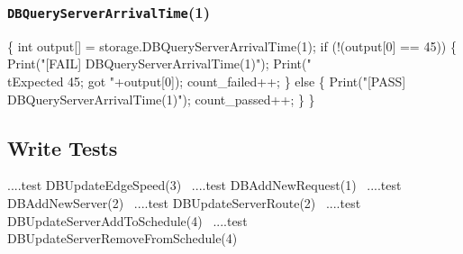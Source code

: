 \documentclass{article}
\def\nwendcode{\endtrivlist \endgroup}
\let\nwdocspar=\par
\begin{document}
\subsubsection{{\tt{}DBQueryServerArrivalTime}(1)}
\nwenddocs{}\endmoddef{}
\{
  int output[] = storage.DBQueryServerArrivalTime(1);
  if (!(output[0] == 45)) \{
    Print("[FAIL] DBQueryServerArrivalTime(1)");
    Print("\\tExpected 45; got "+output[0]);
    count_failed++;
  \} else \{
    Print("[PASS] DBQueryServerArrivalTime(1)");
    count_passed++;
  \}
\}
\nwendcode{}\nwdocspar

\subsection{Write Tests}
\label{sec:write-tests}
\nwenddocs{}\endmoddef{}
\LA{}....test \code{}DBUpdateEdgeSpeed\edoc{}(3)~{\nwtagstyle{}}\RA{}
\LA{}....test \code{}DBAddNewRequest\edoc{}(1)~{\nwtagstyle{}}\RA{}
\LA{}....test \code{}DBAddNewServer\edoc{}(2)~{\nwtagstyle{}}\RA{}
\LA{}....test \code{}DBUpdateServerRoute\edoc{}(2)~{\nwtagstyle{}}\RA{}
\LA{}....test \code{}DBUpdateServerAddToSchedule\edoc{}(4)~{\nwtagstyle{}}\RA{}
\LA{}....test \code{}DBUpdateServerRemoveFromSchedule\edoc{}(4)~{\nwtagstyle{}}\RA{}
\nwendcode{}\nwdocspar
\end{document}
